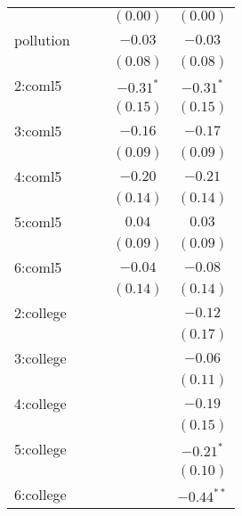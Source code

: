 \begin{table}
\begin{center}
\begin{tabular}{l c c c c }
               &               &               & $(0.00)$      & $(0.00)$      \\
pollution      &               &               & $-0.03$       & $-0.03$       \\
               &               &               & $(0.08)$      & $(0.08)$      \\
2:coml5        &               &               & $-0.31^{*}$   & $-0.31^{*}$   \\
               &               &               & $(0.15)$      & $(0.15)$      \\
3:coml5        &               &               & $-0.16$       & $-0.17$       \\
               &               &               & $(0.09)$      & $(0.09)$      \\
4:coml5        &               &               & $-0.20$       & $-0.21$       \\
               &               &               & $(0.14)$      & $(0.14)$      \\
5:coml5        &               &               & $0.04$        & $0.03$        \\
               &               &               & $(0.09)$      & $(0.09)$      \\
6:coml5        &               &               & $-0.04$       & $-0.08$       \\
               &               &               & $(0.14)$      & $(0.14)$      \\
2:college      &               &               &               & $-0.12$       \\
               &               &               &               & $(0.17)$      \\
3:college      &               &               &               & $-0.06$       \\
               &               &               &               & $(0.11)$      \\
4:college      &               &               &               & $-0.19$       \\
               &               &               &               & $(0.15)$      \\
5:college      &               &               &               & $-0.21^{*}$   \\
               &               &               &               & $(0.10)$      \\
6:college      &               &               &               & $-0.44^{**}$  \\

\end{tabular}
\end{center}
\end{table}
